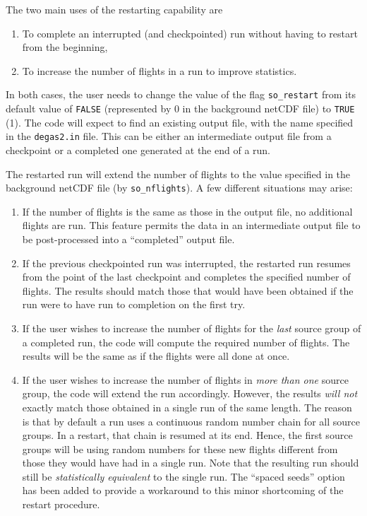 \documentclass[12pt]{report}
\begin{document}
The two main uses of the restarting capability are 

\begin{enumerate}
  \item To complete an interrupted (and checkpointed) run without having
to restart from the beginning,
  \item To increase the number of flights in a run to improve statistics.
\end{enumerate}

In both cases, the user needs to change the value of the flag 
{\tt so\_restart} from its default value of {\tt FALSE} (represented
by 0 in the background netCDF file) to {\tt TRUE} (1). The code will
expect to find an existing output file, with the name specified in
the {\tt degas2.in} file. This can be either an intermediate
output file from a checkpoint or a completed one generated at the
end of a run. 

The restarted run will extend the number of flights to the value specified
in the background netCDF file (by {\tt so\_nflights}). A few different
situations may arise:

\begin{enumerate}
  \item If the number of flights is the same as those in the output file,
no additional flights are run. This feature permits the data in an
intermediate output file to be post-processed into a ``completed''
output file.
  \item If the previous checkpointed run was interrupted, the restarted
run resumes from the point of the last checkpoint and completes the
specified number of flights. The results should match those that would
have been obtained if the run were to have run to completion on the first
try.
  \item If the user wishes to increase the number of flights for 
the {\em last} source group of a completed run, the code will compute the
required number of flights. The results will be the same as if the
flights were all done at once.
  \item If the user wishes to increase the number of flights in {\em more
than one} source group, the code will extend the run accordingly. However,
the results {\em will not} exactly match those obtained in a single run of
the same length. The reason is that by default a run uses a continuous
random number chain for all source groups. In a restart, that chain is
resumed at its end. Hence, the first source groups will be using 
random numbers for these new flights different from those they would have
had in a single run. Note that the resulting run should still be
{\em statistically equivalent} to the single run. The ``spaced seeds''
option has been added to provide a workaround to this minor shortcoming
of the restart procedure.
\end{enumerate}
\end{document}
